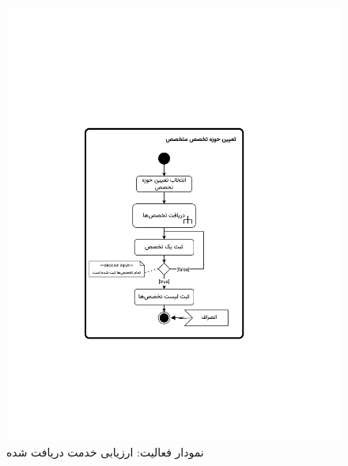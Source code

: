 \begin{figure}
	\centering
	\includegraphics[scale=0.8, page=6]{figs/OOD-activity21-30.pdf}
	\caption{نمودار فعالیت: ارزیابی خدمت دریافت شده}
\end{figure}
\FloatBarrier
\newpage

